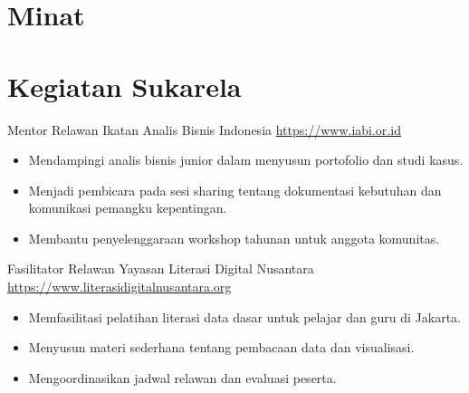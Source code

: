 \documentclass[a4paper, serif, 10pt]{moderncv}
\begin{document}
\section{Minat}

\section{Kegiatan Sukarela}

        {Mentor Relawan}
        {Ikatan Analis Bisnis Indonesia}
        {\url{https://www.iabi.or.id}}
        {}
        {\begin{itemize}
\item Mendampingi analis bisnis junior dalam menyusun portofolio dan studi kasus.
\item Menjadi pembicara pada sesi sharing tentang dokumentasi kebutuhan dan komunikasi pemangku kepentingan.
\item Membantu penyelenggaraan workshop tahunan untuk anggota komunitas.
\end{itemize}}
    

        {Fasilitator Relawan}
        {Yayasan Literasi Digital Nusantara}
        {\url{https://www.literasidigitalnusantara.org}}
        {}
        {\begin{itemize}
\item Memfasilitasi pelatihan literasi data dasar untuk pelajar dan guru di Jakarta.
\item Menyusun materi sederhana tentang pembacaan data dan visualisasi.
\item Mengoordinasikan jadwal relawan dan evaluasi peserta.
\end{itemize}}
    
\end{document}
